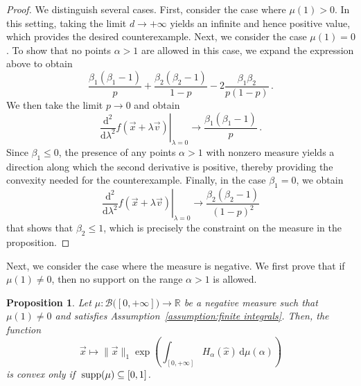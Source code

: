 \documentclass[aps,pra,11pt,onecolumn,nofootinbib,tightenlines]{revtex4-2}
\newtheorem{proposition}[theorem]{Proposition}
\theoremstyle{definition}
\def \d {\mathrm{d}}
\newcommand{\mc}[1]{\mathcal{#1}}
\newcommand{\mb}[1]{\mathbb{#1}}
\begin{document}
\begin{proof}
We distinguish several cases. First, consider the case where $\mu(1) > 0$. In this setting, taking the limit $d \to +\infty$ yields an infinite and hence positive value, which provides the desired counterexample. Next, we consider the case $\mu(1) = 0$. To show that no points $\alpha > 1$ are allowed in this case, we expand the expression above to obtain
\begin{equation}
    \frac{\beta_1(\beta_1-1)}{p}+\frac{\beta_2(\beta_2-1)}{1-p}-2\frac{\beta_1\beta_2}{p(1-p)} \,.
\end{equation}
We then take the limit $p \rightarrow 0$  and obtain
\begin{equation}
    \left.\frac{\d^2 }{\d\lambda^2}f(\vec{x}+\lambda\vec{v})\right\vert_{\lambda=0} \rightarrow \frac{\beta_1(\beta_1-1)}{p} \,.
\end{equation}
Since $\beta_1 \leq 0$, the presence of any points $\alpha > 1$ with nonzero measure yields a direction along which the second derivative is positive, thereby providing the convexity needed for the counterexample. Finally, in the case $\beta_1 = 0$, we obtain
\begin{equation}
    \left.\frac{\d^2 }{\d\lambda^2}f(\vec{x}+\lambda\vec{v})\right\vert_{\lambda=0} \rightarrow \frac{\beta_2(\beta_2-1)}{(1-p)^2} 
\end{equation}
that shows that $\beta_2 \leq 1$, which is precisely the constraint on the measure in the proposition.
\end{proof}



%
Next, we consider the case where the measure is negative. 
We first prove that if $\mu(1) \neq 0$, then no support on the range $\alpha>1$ is allowed.



\begin{proposition}
\label{prop: prop no alpha=1}
Let $\mu:\mc B\big([0,+\infty]\big)\to\mb R$ be a negative measure such that $\mu(1) \neq 0$ and satisfies Assumption~\ref{assumption:finite integrals}.
Then, the function
\begin{equation}
    \vec{x} \longmapsto \|\vec{x}\|_1 \exp\left( \int_{[0,+\infty]} H_\alpha(\hat{x}) \,\d\mu(\alpha) \right)
\end{equation}
    is convex only if $\;\textup{supp}(\mu) \subseteq [0,1]$.
\end{proposition}
\end{document}
